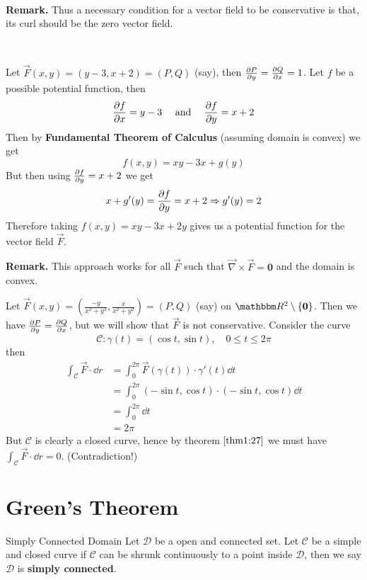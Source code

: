 \documentclass[Analysis-3]{subfiles}
\begin{document}
\ 

\textbf{Remark.} Thus a necessary condition for a vector field to be conservative is that, its curl should be the zero vector field. 

\ 

\begin{Eg}{}{}
    Let $\vec{F}(x,y) = (y-3,x+2) = (P,Q)$ (say), then $\pdv{P}{y} = \pdv{Q}{x} = 1$. Let $f$ be a possible potential function, then 
    \[
        \pdv{f}{x} = y-3 \quad \mbox{ and } \quad \pdv{f}{y} = x+2     
    \] 
    Then by \textbf{Fundamental Theorem of Calculus} (assuming domain is convex) we get 
    \[
        f(x,y) = xy - 3x + g(y)    
    \] 
    But then using $\pdv{f}{y} = x+2$ we get 
    \[
        x + g'(y) = \pdv{f}{y} = x+2 \Rightarrow g'(y) = 2     
    \]
    Therefore taking $f(x,y) = xy - 3x + 2y$ gives us a potential function for the vector field $\vec{F}$. 
\end{Eg}


\textbf{Remark.} This approach works for all $\vec{F}$ such that $\vec{\nabla} \times \vec{F} = \mathbf{0}$ and the domain is convex.   

\begin{Eg}{}{}
    Let $\vec{F}(x,y) = \left( \frac{-y}{x^2+y^2}, \frac{x}{x^2+y^2} \right) = (P,Q)$ (say) on $\R^2 \setminus \{\mathbf{0}\}$. Then we have $\pdv{P}{y} = \pdv{Q}{x}$, but we will show that $\vec{F}$ is not conservative. Consider the curve 
    \[
        \mathcal{C} : \gamma(t) = ( \cos t, \sin t), \quad 0 \leq t \leq 2\pi    
    \]
    then 
    \begin{align*}
        \int_{\mathcal{C}} \vec{F} \cdot \dd r &= \int_0^{2\pi}  \vec{F}(\gamma(t))\cdot \gamma'(t)  \dd t \\ 
        &= \int_0^{2\pi}  (-\sin t, \cos t) \cdot (-\sin t, \cos t) \dd t \\ 
        &= \int_0^{2\pi} \dd t \\ 
        &= 2\pi
    \end{align*}
    But $\mathcal{C}$ is clearly a closed curve, hence by theorem $\ref{thm1:27}$ we must have $\int_{\mathcal{C}} \vec{F} \cdot \dd r = 0$. (Contradiction!)
\end{Eg}

\section{Green's Theorem}

\begin{Def}{Simply Connected Domain}{}
    Let $\mathcal{D}$ be a open and connected set. Let $\mathcal{C}$ be a simple and closed curve if $\mathcal{C}$ can be shrunk continuously to a point inside $\mathcal{D}$, then we say $\mathcal{D}$ is \textbf{simply connected}.
\end{Def}
\end{document}
